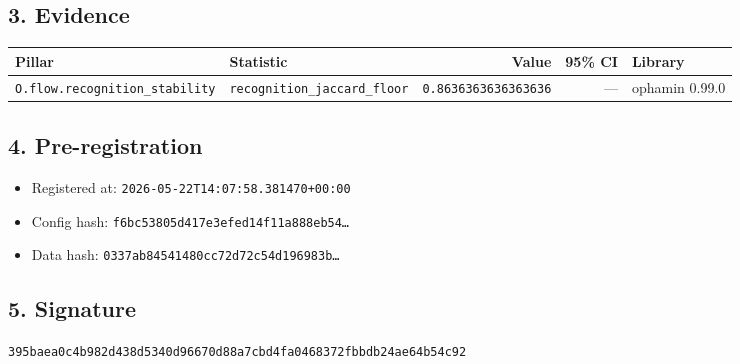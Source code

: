 \documentclass{article}
\begin{document}
\subsection*{3. Evidence}
\begin{tabular}{llrrl}\toprule
\textbf{Pillar} & \textbf{Statistic} & \textbf{Value} & \textbf{95\% CI} & \textbf{Library} \\\midrule
\texttt{O.flow.recognition\_stability} & \texttt{recognition\_jaccard\_floor} & \texttt{0.8636363636363636} & --- & ophamin 0.99.0 \\
\bottomrule\end{tabular}
\subsection*{4. Pre-registration}
\begin{itemize}
\item Registered at: \texttt{2026-05-22T14:07:58.381470+00:00}
\item Config hash: \texttt{f6bc53805d417e3efed14f11a888eb54\dots}
\item Data hash: \texttt{0337ab84541480cc72d72c54d196983b\dots}
\end{itemize}
\subsection*{5. Signature}
\texttt{395baea0c4b982d438d5340d96670d88a7cbd4fa0468372fbbdb24ae64b54c92}\\
\end{document}

